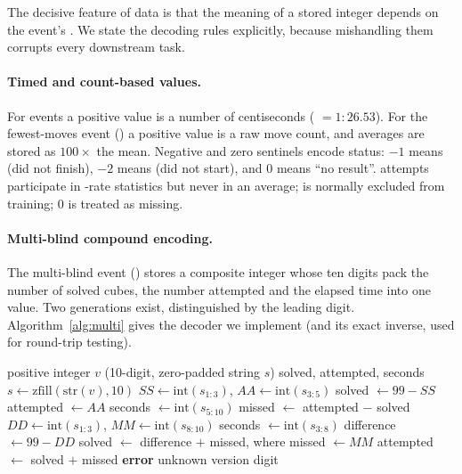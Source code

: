 The decisive feature of \wca{} data is that the meaning of a stored integer
depends on the event's . We state the decoding rules explicitly,
because mishandling them corrupts every downstream task.

\paragraph{Timed and count-based values.}
For  events a positive value is a number of centiseconds
( $= 1{:}26.53$). For the fewest-moves event () a
positive value is a raw move count, and averages are stored as $100\times$ the
mean. Negative and zero sentinels encode status: $-1$ means \DNF{} (did not
finish), $-2$ means \DNS{} (did not start), and $0$ means ``no result''.
\DNF{} attempts participate in \DNF{}-rate statistics but never in an average;
\DNS{} is normally excluded from training; $0$ is treated as missing.

\paragraph{Multi-blind compound encoding.}
The multi-blind event () stores a composite integer whose ten
digits pack the number of solved cubes, the number attempted and the elapsed
time into one value. Two generations exist, distinguished by the leading digit.
Algorithm~\ref{alg:multi} gives the decoder we implement (and its exact
inverse, used for round-trip testing).

\begin{algorithm}[t]
\caption{Decoding of the \wca{} multi-blind compound value.}
\label{alg:multi}
\begin{algorithmic}[1]
\Require positive integer $v$ (10-digit, zero-padded string $s$)
\Ensure solved, attempted, seconds
\State $s \gets \mathrm{zfill}(\mathrm{str}(v), 10)$
 
    \State $SS \gets \mathrm{int}(s_{1:3})$, $AA \gets \mathrm{int}(s_{3:5})$
    \State solved $\gets 99 - SS$
    \State attempted $\gets AA$
    \State seconds $\gets \mathrm{int}(s_{5:10})$
    \State missed $\gets$ attempted $-$ solved 
 
    \State $DD \gets \mathrm{int}(s_{1:3})$, $MM \gets \mathrm{int}(s_{8:10})$
    \State seconds $\gets \mathrm{int}(s_{3:8})$
    \State difference $\gets 99 - DD$
    \State solved $\gets$ difference $+$ missed, where missed $\gets MM$
    \State attempted $\gets$ solved $+$ missed
\Else
    \State \textbf{error} unknown version digit
\EndIf
\end{algorithmic}
\end{algorithm}

